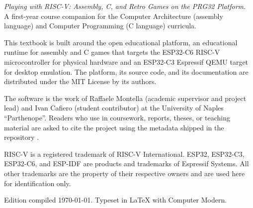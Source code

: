 \thispagestyle{empty}
\vspace*{\fill}
\noindent
{\small
\textit{Playing with RISC-V: Assembly, C, and Retro Games on the PRG32 Platform.}\\
A first-year course companion for the Computer Architecture (assembly language)
and Computer Programming (C language) curricula.\par
\vspace{1em}

\noindent
This textbook is built around the \prg open educational platform, an
educational runtime for \riscv assembly and C games that targets the
ESP32\nobreakdash-C6 RISC\nobreakdash-V microcontroller for physical hardware
and an ESP32\nobreakdash-C3 Espressif QEMU target for desktop emulation. The
platform, its source code, and its documentation are distributed under the MIT
License by its authors.\par
\vspace{1em}

\noindent
The \prg software is the work of Raffaele Montella (academic supervisor and
project lead) and Ivan Cafiero (student contributor) at the University of Naples
``Parthenope''. Readers who use \prg in coursework, reports, theses, or teaching
material are asked to cite the project using the  metadata
shipped in the repository \citep{prg32repo}.\par
\vspace{1em}

\noindent
RISC\nobreakdash-V is a registered trademark of RISC\nobreakdash-V
International. ESP32, ESP32\nobreakdash-C3, ESP32\nobreakdash-C6, and ESP\nobreakdash-IDF are
products and trademarks of Espressif Systems. All other trademarks are the
property of their respective owners and are used here for identification only.\par
\vspace{1em}

\noindent
Edition compiled \today. Typeset in \LaTeX{} with Computer Modern.\par
}
\vspace*{\fill}
\clearpage
